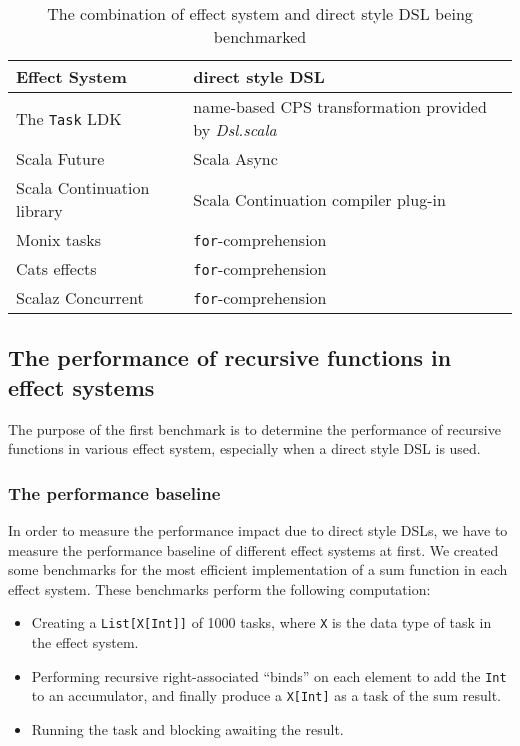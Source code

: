 \begin{table}[htbp]
  \begin{tabular}{l|l}
    Effect System & direct style DSL \\
    \hline
    The \texttt{Task} LDK & name-based CPS transformation provided by \textit{Dsl.scala} \\
    Scala Future \cite{haller2012sip} & Scala Async \cite{haller2013sip} \\
    Scala Continuation library \cite{rompf2009implementing} & Scala Continuation compiler plug-in \\
    Monix tasks \cite{nedelcu2017monix} & \texttt{for}-comprehension \\
    Cats effects \cite{typelevel2017cats} & \texttt{for}-comprehension \\
    Scalaz Concurrent \cite{kenji2017scalaz} & \texttt{for}-comprehension \\
  \end{tabular}
  \caption{The combination of effect system and direct style DSL being benchmarked}
  \label{combination}
\end{table}

\subsection{The performance of recursive functions in effect systems}

The purpose of the first benchmark is to determine the performance of recursive functions in various effect system, especially when a direct style DSL is used.

\subsubsection{The performance baseline}

In order to measure the performance impact due to direct style DSLs, we have to measure the performance baseline of different effect systems at first. We created some benchmarks for the most efficient implementation of a sum function in each effect system. These benchmarks perform the following computation:

\begin{itemize}
  \item Creating a \lstinline{List[X[Int]]} of 1000 tasks, where \lstinline{X} is the data type of task in the effect system.
  \item Performing recursive right-associated ``binds'' on each element to add the \lstinline{Int} to an accumulator, and finally produce a \lstinline{X[Int]} as a task of the sum result.
  \item Running the task and blocking awaiting the result.
\end{itemize}

